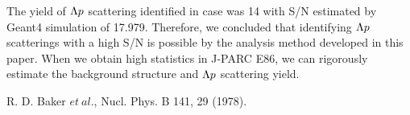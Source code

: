 \documentclass[a4paper,11pt,twoside,twocolumn]{article}
\begin{document}
The yield of $\Lambda p$ scattering identified in case  was 14 with S/N estimated by Geant4 simulation of 17.979. Therefore, we concluded that identifying $\Lambda p$ scatterings with a high S/N is possible by the analysis method developed in this paper. When we obtain high statistics in J-PARC E86, we can rigorously estimate the background structure and $\Lambda p$ scattering yield. 



{\scriptsize{
\begin{thebibliography}{9}
R. D. Baker $et\ al.$, Nucl. Phys. B 141, 29 (1978).
\end{thebibliography}
}}
\end{document}
